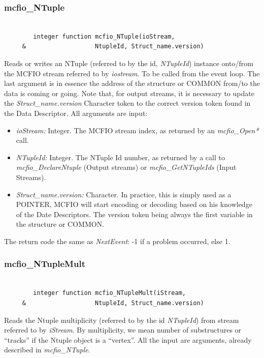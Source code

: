 \subsubsection{mcfio\_NTuple}

\begin{verbatim}

        integer function mcfio_NTuple(ioStream,
     &                   NtupleId, Struct_name.version)

\end{verbatim}

	Reads or writes an NTuple (referred to by the id, {\em NTupleId})
instance onto/from the MCFIO stream referred to by {\em iostream}. To be called
from the event loop. The last argument is in essence the address of the
structure or COMMON from/to the data is coming or going. Note that, for
output streams, it is necessary to update the {\em Struct\_name.version}
Character token to the correct version token found in the Data Descriptor.
All arguments are input:

\begin{itemize}
\item {\em ioStream:} Integer. The MCFIO stream index, as returned by an {\em
mcfio\_Open*} call.
\item {\em NTupleId:} Integer. The NTuple Id number, as returned by a call to
{\em mcfio\_DeclareNtuple} (Output streams) or {\em mcfio\_GetNTupleIds}
(Input Streams).
\item {\em Struct\_name.version:} Character. In practice, this is simply used
as a POINTER, MCFIO will start encoding or decoding based on his knowledge
of the Date Descriptors.  The version token being always the first variable
in the structure or COMMON.
\end{itemize}
	The return code the same as {\em NextEvent}: -1 if a problem occurred,
else 1.

\subsubsection{mcfio\_NTupleMult}

\begin{verbatim}

        integer function mcfio_NTupleMult(iStream,
     &                   NtupleId, Struct_name.version)

\end{verbatim}

	Reads the Ntuple multiplicity (referred to by the id {\em NTupleId})
from stream referred to by {\em iStream}.  By multiplicity, we mean number of
substructures or ``tracks'' if the Ntuple object is a ``vertex''.  All
the input are arguments, already described in {\em mcfio\_NTuple}.


